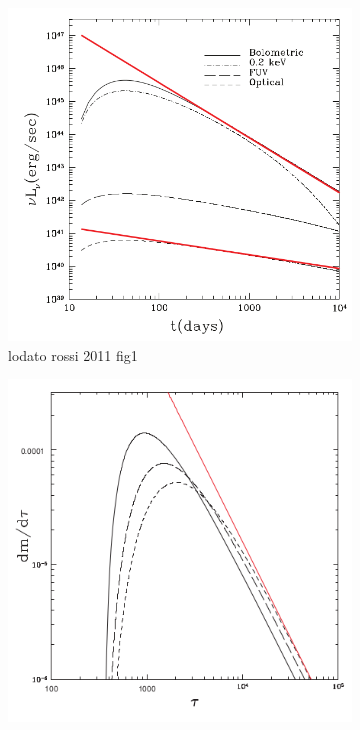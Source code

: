 \documentclass{tda}
\begin{document}
\begin{figure}
	\begin{subfigure} {.33\linewidth}
		\centering
		\includegraphics[width=\textwidth]{./images/lodato_rossi2011.png}
		\caption{lodato rossi 2011 fig1}
	\end{subfigure}
	\begin{subfigure} {.33\linewidth}
		\centering
		\includegraphics[width=\textwidth]{./images/lodato2009a.png}

\end{subfigure}
\end{figure}
\end{document}
